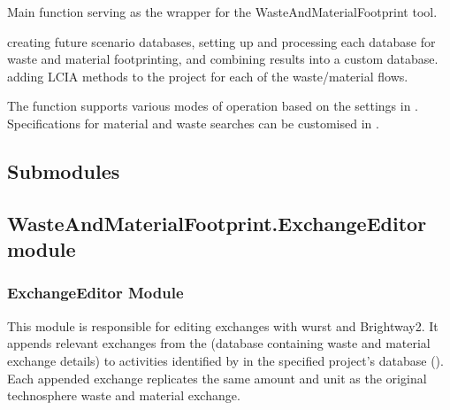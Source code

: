 \documentclass[letterpaper,10pt,english]{sphinxmanual}
\begin{document}
\begin{fulllineitems}
\label{\detokenize{WasteAndMaterialFootprint:WasteAndMaterialFootprint.main.run}}
\pysigstartsignatures
{}
\pysigstopsignatures
\sphinxAtStartPar
Main function serving as the wrapper for the WasteAndMaterialFootprint tool.
\begin{description}
\sphinxAtStartPar
creating future scenario databases,
setting up and processing each database for waste and material footprinting,
and combining results into a custom database.
adding LCIA methods to the project for each of the waste/material flows.

\end{description}

\sphinxAtStartPar
The function supports various modes of operation based on the settings in .
Specifications for material and waste searches can be customised in .

\end{fulllineitems}



\subsection{Submodules}
\label{\detokenize{WasteAndMaterialFootprint:submodules}}

\subsection{WasteAndMaterialFootprint.ExchangeEditor module}
\label{\detokenize{WasteAndMaterialFootprint:module-WasteAndMaterialFootprint.ExchangeEditor}}\label{\detokenize{WasteAndMaterialFootprint:wasteandmaterialfootprint-exchangeeditor-module}}

\subsubsection{ExchangeEditor Module}
\label{\detokenize{WasteAndMaterialFootprint:exchangeeditor-module}}
\sphinxAtStartPar
This module is responsible for editing exchanges with wurst and Brightway2.
It appends relevant exchanges from the  (database containing waste and material exchange details) 
to activities identified by  in the specified project’s database ().
Each appended exchange replicates the same amount and unit as the original technosphere waste and material exchange.
\end{document}
